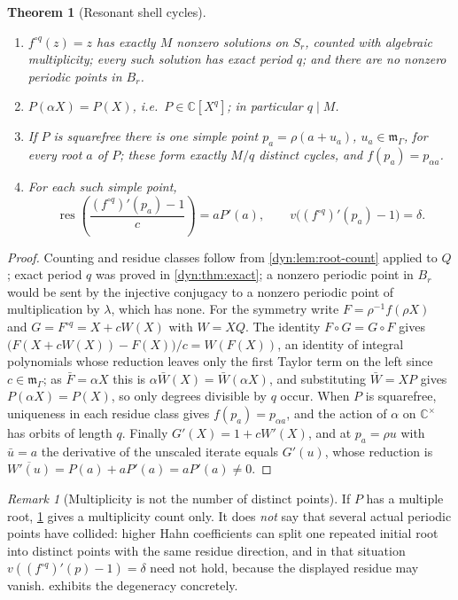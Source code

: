 \documentclass[11pt,letterpaper]{article}
\newtheorem{theorem}{Theorem}[section]
\theoremstyle{definition}
\theoremstyle{remark}
\newtheorem{remark}[remark]{Remark}
\newcommand{\C}{\mathbb C}
\newcommand{\m}{\mathfrak m}
\newcommand{\res}{\operatorname{res}}
\numberwithin{equation}{section}
\begin{document}
\begin{theorem}[Resonant shell cycles]\label{dyn:thm:shell}
\begin{enumerate}[label=(\roman*)]
\item $f^{\circ q}(z)=z$ has exactly $M$ nonzero solutions on $S_r$,
counted with algebraic multiplicity; every such solution has exact period
$q$; and there are no nonzero periodic points in $B_r$.
\item $P(\alpha X)=P(X)$, i.e.\ $P\in\C[X^{q}]$; in particular $q\mid M$.
\item If $P$ is squarefree there is one simple point
$p_a=\rho(a+u_a)$, $u_a\in\m_\Gamma$, for every root $a$ of $P$; these form
exactly $M/q$ distinct cycles, and $f(p_a)=p_{\alpha a}$.
\item For each such simple point,
\begin{equation}\label{dyn:eq:multiplier}
 \res\left(\frac{(f^{\circ q})'(p_a)-1}{c}\right)=aP'(a),
 \qquad v\bigl((f^{\circ q})'(p_a)-1\bigr)=\delta .
\end{equation}
\end{enumerate}
\end{theorem}
\begin{proof}
Counting and residue classes follow from \cref{dyn:lem:root-count} applied
to $Q$; exact period $q$ was proved in \cref{dyn:thm:exact}; a nonzero
periodic point in $B_r$ would be sent by the injective conjugacy to a
nonzero periodic point of multiplication by $\lambda$, which has none.
For the symmetry write $F=\rho^{-1}f(\rho X)$ and
$G=F^{\circ q}=X+cW(X)$ with $W=XQ$. The identity $F\circ G=G\circ F$ gives
$\bigl(F(X+cW(X))-F(X)\bigr)/c=W(F(X))$, an identity of integral
polynomials whose reduction leaves only the first Taylor term on the left
since $c\in\m_\Gamma$; as $\bar F=\alpha X$ this is
$\alpha\bar W(X)=\bar W(\alpha X)$, and substituting $\bar W=XP$ gives
$P(\alpha X)=P(X)$, so only degrees divisible by $q$ occur. When $P$ is
squarefree, uniqueness in each residue class gives $f(p_a)=p_{\alpha a}$,
and the action of $\alpha$ on $\C^{\times}$ has orbits of length $q$.
Finally $G'(X)=1+cW'(X)$, and at $p_a=\rho u$ with $\bar u=a$ the
derivative of the unscaled iterate equals $G'(u)$, whose reduction is
$\overline{W'(u)}=P(a)+aP'(a)=aP'(a)\ne0$.
\end{proof}

\begin{remark}[Multiplicity is not the number of distinct points]
\label{dyn:rem:multiplicity}
If $P$ has a multiple root, \cref{dyn:thm:shell} gives a multiplicity count
only. It does \emph{not} say that several actual periodic points have
collided: higher Hahn coefficients can split one repeated initial root into
distinct points with the same residue direction, and in that situation
$v((f^{\circ q})'(p)-1)=\delta$ need not hold, because the displayed
residue may vanish.  exhibits the degeneracy
concretely.
\end{remark}
\end{document}
